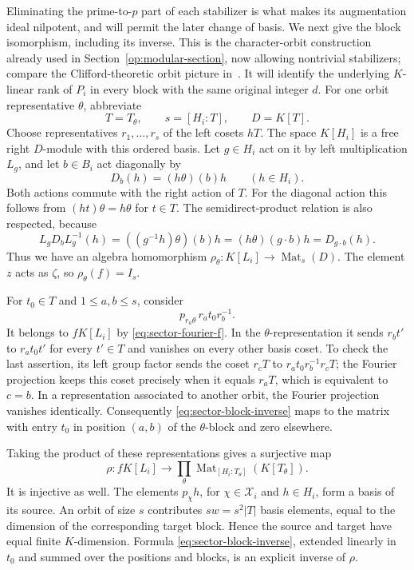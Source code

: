 Eliminating the prime-to-$p$ part of each stabilizer is what makes its
augmentation ideal nilpotent, and will permit the later change of basis.
We next give the block isomorphism, including its inverse. This is the
character-orbit construction already used in
Section~\ref{op:modular-section}, now allowing nontrivial stabilizers;
compare the Clifford-theoretic orbit picture in~\cite{Clifford1937Announcement}.
It will identify the underlying $K$-linear rank of $P_i$ in every block
with the same original integer $d$. For one orbit representative
$\theta$, abbreviate
\[
 T=T_\theta,\qquad s=[H_i:T],\qquad D=K[T].
\]
Choose representatives $r_1,\ldots,r_s$ of the left cosets $hT$.
The space $K[H_i]$ is a free right $D$-module with this ordered basis.
Let $g\in H_i$ act on it by left multiplication $L_g$, and let
$b\in B_i$ act diagonally by
\[
 D_b(h)=(h\theta)(b)h\qquad(h\in H_i).
\]
Both actions commute with the right action of $T$.  For the diagonal
action this follows from $(ht)\theta=h\theta$ for $t\in T$.
The semidirect-product relation is also respected, because
\[
 L_gD_bL_g^{-1}(h)
   =((g^{-1}h)\theta)(b)h
   =(h\theta)(g\cdot b)h
   =D_{g\cdot b}(h).
\]
Thus we have an algebra homomorphism
$\rho_\theta:K[L_i]\to\operatorname{Mat}_s(D)$.
The element $z$ acts as $\zeta$, so $\rho_\theta(f)=I_s$.

For $t_0\in T$ and $1\le a,b\le s$, consider
\begin{equation}\label{eq:sector-block-inverse}
 p_{r_a\theta}\,r_at_0r_b^{-1}.
\end{equation}
It belongs to $fK[L_i]$ by \eqref{eq:sector-fourier-f}.  In the
$\theta$-representation it sends $r_bt'$ to $r_at_0t'$ for every
$t'\in T$ and vanishes on every other basis coset.  To check the last
assertion, its left group factor sends the coset $r_cT$ to
$r_at_0r_b^{-1}r_cT$; the Fourier projection keeps this coset precisely
when it equals $r_aT$, which is equivalent to $c=b$.  In a
representation associated to another orbit, the Fourier projection
vanishes identically.  Consequently \eqref{eq:sector-block-inverse}
maps to the matrix with entry $t_0$ in position $(a,b)$ of the
$\theta$-block and zero elsewhere.

Taking the product of these representations gives a surjective map
\begin{equation}\label{eq:sector-blocks}
 \rho:fK[L_i]\longrightarrow
 \prod_{\theta}\operatorname{Mat}_{[H_i:T_\theta]}(K[T_\theta]).
\end{equation}
It is injective as well.  The elements $p_\chi h$, for
$\chi\in\mathcal X_i$ and $h\in H_i$, form a basis of its source.
An orbit of size $s$ contributes $sw=s^2|T|$ basis elements, equal to
the dimension of the corresponding target block.  Hence the source
and target have equal finite $K$-dimension.  Formula
\eqref{eq:sector-block-inverse}, extended linearly in $t_0$ and summed
over the positions and blocks, is an explicit inverse of $\rho$.

